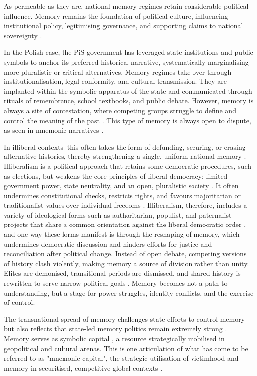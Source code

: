 As permeable as they are, national memory regimes retain considerable political influence. Memory remains the foundation of political culture, influencing institutional policy, legitimising governance, and supporting claims to national sovereignty \citep{subotic_political_2018}.

In the Polish case, the PiS government has leveraged state institutions and public symbols to anchor its preferred historical narrative, systematically marginalising more pluralistic or critical alternatives. Memory regimes take over through institutionalisation, legal conformity, and cultural transmission. They are implanted within the symbolic apparatus of the state and communicated through rituals of remembrance, school textbooks, and public debate. However, memory is always a site of contestation, where competing groups struggle to define and control the meaning of the past \citep{bernhard_notitle_2014}. This type of memory is always open to dispute, as seen in mnemonic narratives \citep{assmann_transnational_2014}.

In illiberal contexts, this often takes the form of defunding, securing, or erasing alternative histories, thereby strengthening a single, uniform national memory \citep{kapralski_jews_2017}. Illiberalism is a political approach that retains some democratic procedures, such as elections, but weakens the core principles of liberal democracy: limited government power, state neutrality, and an open, pluralistic society \citep{zakaria_rise_1997}. It often undermines constitutional checks, restricts rights, and favours majoritarian or traditionalist values over individual freedoms \citep{krastev_age_2011}. Illiberalism, therefore, includes a variety of ideological forms such as authoritarian, populist, and paternalist projects that share a common orientation against the liberal democratic order \citep{enyedi_concept_2024}, and one way these forms manifest is through the reshaping of memory, which undermines democratic discussion and hinders efforts for justice and reconciliation after political change. Instead of open debate, competing versions of history clash violently, making memory a source of division rather than unity. Elites are demonised, transitional periods are dismissed, and shared history is rewritten to serve narrow political goals \citep{bresco_de_luna_end_2017}. Memory becomes not a path to understanding, but a stage for power struggles, identity conflicts, and the exercise of control.

The transnational spread of memory challenges state efforts to control memory but also reflects that state-led memory politics remain extremely strong \citep{verovsek_caught_2021}. Memory serves as symbolic capital \citep{bourdieu_forms_1986}, a resource strategically mobilised in geopolitical and cultural arenas. This is one articulation of what has come to be referred to as "mnemonic capital", the strategic utilisation of victimhood and memory in securitised, competitive global contexts \citep{woycicka_mnemonic_2024}.

